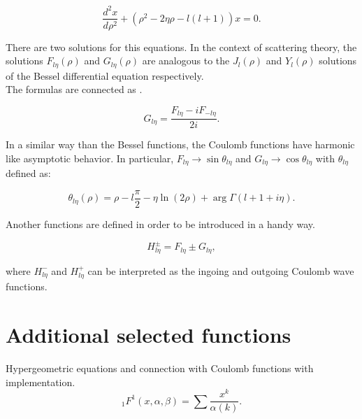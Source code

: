\documentclass[openany]{book}
\begin{document}
\begin{equation}  \label{eq:special_coulomb_diffEquation}
	\frac{d^2x}{d\rho^2}+ (\rho^2 - 2\eta \rho  - l(l+1) )x= 0.
\end{equation}

There are two solutions for this equations. In the context of scattering theory, the solutions $F_{l\eta}(\rho)$ and $G_{l\eta}(\rho)$ are analogous to the  $J_l(\rho)$ and $Y_l(\rho)$ solutions of the Bessel differential equation respectively.  \\

The formulas are connected as \cite{gaspard_2018}.

\begin{equation}  \label{eq:special_coulomb_connection}
	G_{l\eta} = \frac{F_{l\eta} - iF_{-l\eta} }{2i}.
\end{equation}

In a similar way than the Bessel functions, the Coulomb functions have harmonic like asymptotic behavior. In particular,  $F_{l\eta} \rightarrow \sin{\theta_{l\eta}}$ and $G_{l\eta} \rightarrow \cos{\theta_{l\eta}}$ with $\theta_{l\eta}$ defined as:

\begin{equation} \label{eq:special_coulomb_theta}
	\theta_{l\eta}(\rho) = \rho -  l\frac{\pi}{2}  - \eta\ln{(2\rho)} +  \arg\Gamma(l+ 1+i\eta).
\end{equation}

Another functions are defined in order to be introduced in a handy way. 

\begin{equation}\label{eq:special_coulomb_hankel}
	H^{\pm}_{l\eta} = F_{l\eta} \pm G_{l\eta},
\end{equation}

where $H^{-}_{l\eta}$ and $H^{+}_{l\eta}$ can be interpreted as the ingoing and outgoing Coulomb wave functions. 

\section{Additional selected functions} \label{sec:additionalFunctions}

Hypergeometric equations and connection with Coulomb functions with implementation. \\

\begin{equation}\label{eq:selected_hyper}
{}_{1}F^{1}(x, \alpha, \beta) = \sum {\frac{x^k}{\alpha(k)}}.
\end{equation}
\end{document}
